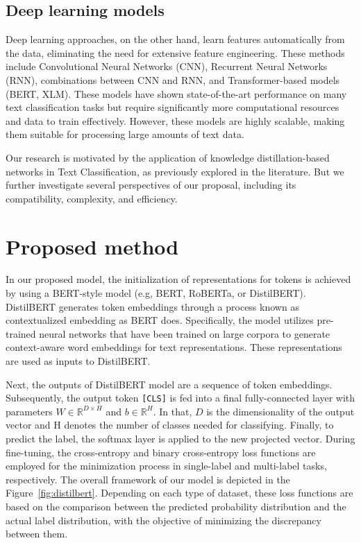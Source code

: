 \documentclass[sn-mathphys,Numbered]{sn-jnl}%
\theoremstyle{thmstyleone}%
\theoremstyle{thmstyletwo}%
\theoremstyle{thmstylethree}%
\begin{document}
\subsection{Deep learning models}
Deep learning approaches, on the other hand, learn features automatically from the data, eliminating the need for extensive feature engineering. These methods include Convolutional Neural Networks (CNN)\cite{Kim2014}, Recurrent Neural Networks (RNN)\cite{Sutskever2014}, combinations between CNN and RNN\cite{Vo2017}, and Transformer-based models (BERT, XLM)\cite{Devlin2019, Conneau2020}. These models have shown state-of-the-art performance on many text classification tasks but require significantly more computational resources and data to train effectively. However, these models are highly scalable, making them suitable for processing large amounts of text data.

Our research is motivated by the application of knowledge distillation-based networks\cite{Gasparetto2022} in Text Classification, as previously explored in the literature. But we further investigate several perspectives of our proposal, including its compatibility, complexity, and efficiency.

\section{Proposed method}\label{proposedmethod}
In our proposed model, the initialization of representations for tokens is achieved by using a BERT-style model (e.g, BERT, RoBERTa, or DistilBERT). DistilBERT generates token embeddings through a process known as contextualized embedding as BERT does. Specifically, the model utilizes pre-trained neural networks that have been trained on large corpora to generate context-aware word embeddings for text representations. These representations are used as inputs to DistilBERT.

Next, the outputs of DistilBERT model are a sequence of token embeddings. Subsequently, the output token \texttt{[CLS]} is fed into a final fully-connected layer with parameters $W \in \mathbb{R}^{D\times H}$ and $b \in \mathbb{R}^H$. In that, $D$ is the dimensionality of the output vector and H denotes the number of classes needed for classifying. Finally, to predict the label, the softmax layer is applied to the new projected vector. During fine-tuning, the cross-entropy and binary cross-entropy loss functions are employed for the minimization process in single-label and multi-label tasks, respectively. The overall framework of our model is depicted in the Figure~\ref{fig:distilbert}. Depending on each type of dataset, these loss functions are based on the comparison between the predicted probability distribution and the actual label distribution, with the objective of minimizing the discrepancy between them.
\end{document}
